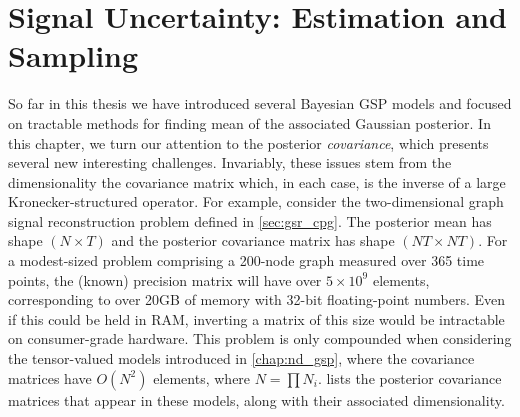 \chapter{Signal Uncertainty: Estimation and Sampling} %

\label{chap:variance} %


So far in this thesis we have introduced several Bayesian GSP models and focused on tractable methods for finding mean of the associated Gaussian posterior. In this chapter, we turn our attention to the posterior \textit{covariance}, which presents several new interesting challenges. Invariably, these issues stem from the dimensionality the covariance matrix which, in each case, is the inverse of a large Kronecker-structured operator. For example, consider the two-dimensional graph signal reconstruction problem defined in \cref{sec:gsr_cpg}. The posterior mean has shape $(N \times T)$ and the posterior covariance matrix has shape $(NT \times NT)$. For a modest-sized problem comprising a 200-node graph measured over 365 time points, the (known) precision matrix will have over $5 \times 10^9$ elements, corresponding to over 20GB of memory with 32-bit floating-point numbers. Even if this could be held in RAM, inverting a matrix of this size would be intractable on consumer-grade hardware. This problem is only compounded when considering the tensor-valued models introduced in \cref{chap:nd_gsp}, where the covariance matrices have $O(N^2)$ elements, where $N = \prod N_i$.  lists the posterior covariance matrices that appear in these models, along with their associated dimensionality. 

\setcellgapes{8pt}
\makegapedcells

